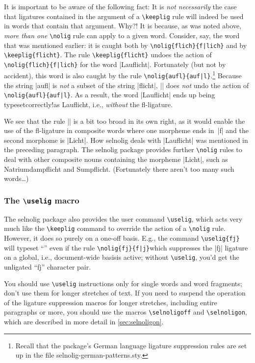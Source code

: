 \documentclass[11pt]{article}
\newcommand{\pkg}[1]{\textsf{#1}}
\newcommand{\opt}[1]{\uselig{\texttt{#1}}}
\newcommand{\cmmd}[1]{\texttt{\textbackslash #1}}
\begin{document}
It is important to be aware of the following fact: It is \emph{not necessarily} the case that ligatures contained in the argument of a \cmmd{keeplig} rule will indeed be used in words that contain that argument. Why?! It is because, as was noted above, \emph{more than one} \cmmd{nolig} rule can apply to a given word. Consider, say, the word \opt{Lauf\-licht} that was mentioned earlier: it is caught both by \Verb+\nolig{flich}{f|lich}+ and by \Verb+\keeplig{flicht}+. The rule \Verb+\keeplig{flicht}+ undoes the action of \Verb+\nolig{flich}{f|lich}+ for the word |Lauflicht|. Fortunately (but not by accident), this word is also caught by the rule \Verb+\nolig{aufl}{auf|l}+.\footnote{Recall that the package's German language ligature suppression rules are set up in the file \pkg{selnolig-german-patterns.sty}.} Because the string |aufl| is \emph{not} a subset of the string |flicht|, || does \emph{not} undo the action of \Verb+\nolig{aufl}{auf|l}+. As a result, the word |Lauflicht| ends up being typeset\textemdash correctly!\textemdash as Lauflicht, i.e., \emph{without} the fl-ligature. 

We see that the rule || is a bit too broad in its own right, as it would enable the use of the fl-ligature in composite words where one morpheme ends in~|f| and the second morphome is |Licht|. How \pkg{selnolig} deals with |Lauflicht| was mentioned in the preceding paragraph. The \pkg{selnolig} package provides further \cmmd{nolig} rules to deal with other composite nouns containing the morpheme |Licht|, such as Natriumdampflicht and Sumpflicht. (Fortunately there aren't too many such words\dots)


\subsubsection{The \cmmd{uselig} macro} 
\label{sec:uselig}

The \pkg{selnolig} package also provides the user command \cmmd{uselig}, which acts very much like the \cmmd{keeplig} command to override the action of a \cmmd{nolig} rule. However, it does so purely on a one-off basis. E.g., the command \Verb+\uselig{fj}+ will typeset \enquote{} even if the rule \Verb+\nolig{fj}{f|j}+\textemdash which suppresses the |fj| ligature on a global, i.e., document-wide basis\textemdash is active; without \cmmd{uselig}, you'd get the unligated \enquote{fj} character pair.

You should use \cmmd{uselig} instructions only for single words and word fragments; don't use them for longer stretches of text. If you need to suspend the operation of the ligature suppression macros for longer stretches, including entire paragraphs or more, you should use the macros \cmmd{selnoligoff} and \cmmd{selnoligon}, which are described in more detail in \cref{sec:selnoligon}.
\end{document}
